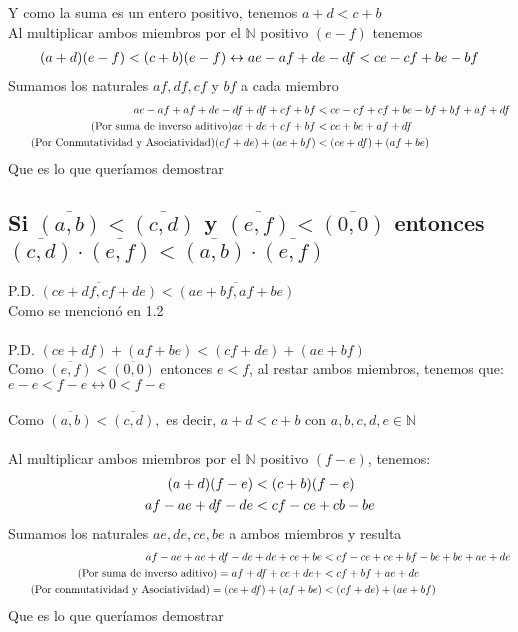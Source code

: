 \documentclass[12pt]{article}
\begin{document}
	        Y como la suma es un entero positivo, tenemos $a+d < c+b$ \\
	        Al multiplicar ambos miembros por el $\mathbb{N}$ positivo $(e-f)$ tenemos
	        \begin{align}
	            \notag (a+d)(e-f) < (c+b)(e-f) \leftrightarrow ae-af+de-df < ce -cf +be -bf
	        \end{align}
	        Sumamos los naturales $af,df,cf$ y $bf$ a cada miembro
	        \begin{align}
	            \notag ae-af+af+de-df+df+cf+bf &< ce-cf+cf+be-bf+bf+af+df \\
	            \tag{Por suma de inverso aditivo} ae+de+cf+bf &< ce+be+af+df \\
	            \tag{Por Conmutatividad y Asociatividad}  (cf+de) + (ae+bf) &< (ce+df) + (af+be)
	        \end{align}
	        Que es lo que queríamos demostrar \blacksquare \\
	    \subsection{Si $\overline{(a,b)} < \overline{(c,d)}$ y $\overline{(e, f)} < \overline{(0,0)}$ entonces $\overline{(c,d)}\cdot\overline{(e, f)} < \overline{(a,b)}\cdot\overline{(e, f)}$}
	        P.D. $\overline{(ce+df,cf+de)} < \overline{(ae+bf,af+be)}$ \\
	        Como se mencionó en 1.2 \\ \\
	        P.D. $(ce+df) + (af+be)<(cf+de)+(ae+bf)$ \\
	        Como $\overline{(e,f)}<\overline{(0,0)}$ entonces $e<f$, al restar ambos miembros, tenemos que: $e-e<f-e \leftrightarrow 0<f-e$ \\ \\
	        Como $\overline{(a,b)} < \overline{(c,d)},$ es decir, $a+d<c+b$ con $a,b,c,d,e \in \mathbb{N}$ \\ \\
	        Al multiplicar ambos miembros por el $\mathbb{N}$ positivo $(f-e)$, tenemos:
	        \begin{align}
	            \notag (a+d)(f-e) &< (c+b)(f-e) \\
	            \notag af-ae+df-de &< cf-ce+cb-be
	        \end{align}
	        Sumamos los naturales $ae,de,ce,be$ a ambos miembros y resulta
	        \begin{align}
	            \notag af-ae+ae+df-de+de+ce+be &< cf-ce+ce+bf-be+be+ae+de \\
	            \tag{Por suma de inverso aditivo} = af + df + ce + de + &< cf + bf + ae + de \\
	            \tag{Por conmutatividad y Asociatividad} = (ce+df) + (af+be) &< (cf+de)+(ae+bf)
	        \end{align}
	        Que es lo que queríamos demostrar \blacksquare
\end{document}
